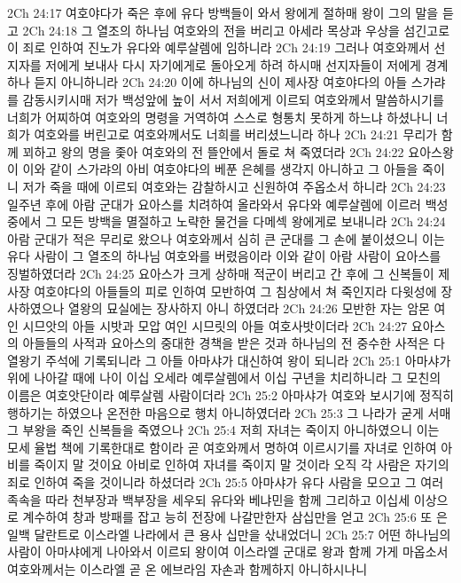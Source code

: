 2Ch 24:17  여호야다가 죽은 후에 유다 방백들이 와서 왕에게 절하매 왕이 그의 말을 듣고
2Ch 24:18  그 열조의 하나님 여호와의 전을 버리고 아세라 목상과 우상을 섬긴고로 이 죄로 인하여 진노가 유다와 예루살렘에 임하니라
2Ch 24:19  그러나 여호와께서 선지자를 저에게 보내사 다시 자기에게로 돌아오게 하려 하시매 선지자들이 저에게 경계하나 듣지 아니하니라
2Ch 24:20  이에 하나님의 신이 제사장 여호야다의 아들 스가랴를 감동시키시매 저가 백성앞에 높이 서서 저희에게 이르되 여호와께서 말씀하시기를 너희가 어찌하여 여호와의 명령을 거역하여 스스로 형통치 못하게 하느냐 하셨나니 너희가 여호와를 버린고로 여호와께서도 너희를 버리셨느니라 하나
2Ch 24:21  무리가 함께 꾀하고 왕의 명을 좇아 여호와의 전 뜰안에서 돌로 쳐 죽였더라
2Ch 24:22  요아스왕이 이와 같이 스가랴의 아비 여호야다의 베푼 은혜를 생각지 아니하고 그 아들을 죽이니 저가 죽을 때에 이르되 여호와는 감찰하시고 신원하여 주옵소서 하니라
2Ch 24:23  일주년 후에 아람 군대가 요아스를 치려하여 올라와서 유다와 예루살렘에 이르러 백성 중에서 그 모든 방백을 멸절하고 노략한 물건을 다메섹 왕에게로 보내니라
2Ch 24:24  아람 군대가 적은 무리로 왔으나 여호와께서 심히 큰 군대를 그 손에 붙이셨으니 이는 유다 사람이 그 열조의 하나님 여호와를 버렸음이라 이와 같이 아람 사람이 요아스를 징벌하였더라
2Ch 24:25  요아스가 크게 상하매 적군이 버리고 간 후에 그 신복들이 제사장 여호야다의 아들들의 피로 인하여 모반하여 그 침상에서 쳐 죽인지라 다윗성에 장사하였으나 열왕의 묘실에는 장사하지 아니 하였더라
2Ch 24:26  모반한 자는 암몬 여인 시므앗의 아들 시밧과 모압 여인 시므릿의 아들 여호사밧이더라
2Ch 24:27  요아스의 아들들의 사적과 요아스의 중대한 경책을 받은 것과 하나님의 전 중수한 사적은 다 열왕기 주석에 기록되니라 그 아들 아마샤가 대신하여 왕이 되니라
2Ch 25:1  아마샤가 위에 나아갈 때에 나이 이십 오세라 예루살렘에서 이십 구년을 치리하니라 그 모친의 이름은 여호앗단이라 예루살렘 사람이더라
2Ch 25:2  아마샤가 여호와 보시기에 정직히 행하기는 하였으나 온전한 마음으로 행치 아니하였더라
2Ch 25:3  그 나라가 굳게 서매 그 부왕을 죽인 신복들을 죽였으나
2Ch 25:4  저희 자녀는 죽이지 아니하였으니 이는 모세 율법 책에 기록한대로 함이라 곧 여호와께서 명하여 이르시기를 자녀로 인하여 아비를 죽이지 말 것이요 아비로 인하여 자녀를 죽이지 말 것이라 오직 각 사람은 자기의 죄로 인하여 죽을 것이니라 하셨더라
2Ch 25:5  아마샤가 유다 사람을 모으고 그 여러 족속을 따라 천부장과 백부장을 세우되 유다와 베냐민을 함께 그리하고 이십세 이상으로 계수하여 창과 방패를 잡고 능히 전장에 나갈만한자 삼십만을 얻고
2Ch 25:6  또 은 일백 달란트로 이스라엘 나라에서 큰 용사 십만을 삯내었더니
2Ch 25:7  어떤 하나님의 사람이 아마샤에게 나아와서 이르되 왕이여 이스라엘 군대로 왕과 함께 가게 마옵소서 여호와께서는 이스라엘 곧 온 에브라임 자손과 함께하지 아니하시나니
